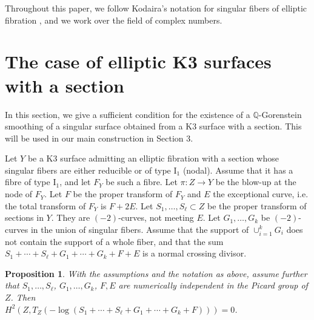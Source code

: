\documentclass[twoside,11pt]{amsart}
\newtheorem{proposition}{Proposition}[section]
\begin{document}
{\medskip}
Throughout this paper, we follow Kodaira's notation for singular
fibers of elliptic fibration \cite{Kodaira}, and we work over the
field of complex numbers.

\section{The case of elliptic K3 surfaces with a section}
\label{sec-2}

In this section, we give a sufficient condition for the existence
of a ${{\mathbb Q}}$-Gorenstein smoothing of a singular surface obtained
from a K3 surface with a section.  This will be used in our main
construction in Section 3.

{\medskip}
Let $Y$ be a K3 surface admitting an elliptic fibration with a
section whose singular fibers are either reducible or of type
$\mathrm{I_1}$ (nodal). Assume that it has a fibre of type
$\mathrm{I_1}$, and let $F_Y$ be such a fibre. Let $\pi: Z\to Y$
be the blow-up at the node of $F_Y$. Let $F$ be the proper
transform of $F_Y$ and $E$ the exceptional curve, i.e. the total
transform of $F_Y$ is $F+2E$. Let $S_1, \ldots, S_\ell\subset Z$
be the proper transform of sections in $Y$. They are
$(-2)$-curves, not meeting $E$. Let $G_1,\ldots, G_k$ be
$(-2)$-curves in the union of singular fibers. Assume that the
support of $\cup_{i=1}^k G_i$ does not contain the support of a
whole fiber, and that the sum $S_1+\cdots +
S_\ell+G_1+\cdots+G_k+F+E$ is a normal crossing divisor.

\begin{proposition}
\label{prop 2.1} With the assumptions and the notation as above,
assume further that $S_1,\ldots, S_\ell$, $G_1, \ldots, G_k$, $F,
E$
are numerically independent in the Picard group of $Z$. Then\\
$H^2(Z, T_Z(-{\operatorname{log}}(S_1+\cdots + S_\ell+G_1+\cdots+G_k+F)))=0$.
\end{proposition}
\end{document}
